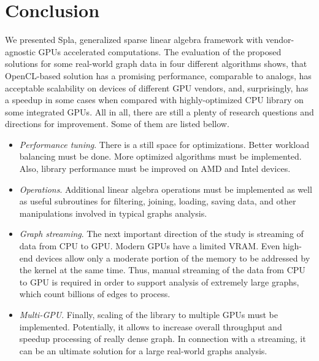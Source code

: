 \section{Conclusion}

We presented Spla, generalized sparse linear algebra framework with vendor-agnostic GPUs accelerated computations. The evaluation of the proposed solutions for some real-world graph data in four different algorithms shows, that OpenCL-based solution has a promising performance, comparable to analogs, has acceptable scalability on devices of different GPU vendors, and, surprisingly, has a speedup in some cases when compared with highly-optimized CPU library on some integrated GPUs. All in all, there are still a plenty of research questions and directions for improvement. Some of them are listed bellow.

\begin{itemize}
    \item \textit{Performance tuning}. There is a still space for optimizations. Better workload balancing must be done. More optimized algorithms must be implemented. Also, library performance must be improved on AMD and Intel devices.
    \item \textit{Operations}. Additional linear algebra operations must be implemented as well as useful subroutines for filtering, joining, loading, saving data, and other manipulations involved in typical graphs analysis.
    \item \textit{Graph streaming}. The next important direction of the study is streaming of data from CPU to GPU. Modern GPUs have a limited VRAM. Even high-end devices allow only a moderate portion of the memory to be addressed by the kernel at the same time. Thus, manual streaming of the data from CPU to GPU is required in order to support analysis of extremely large graphs, which count billions of edges to process.
    \item \textit{Multi-GPU}. Finally, scaling of the library to multiple GPUs must be implemented. Potentially, it allows to increase overall throughput and speedup processing of really dense graph. In connection with a streaming, it can be an ultimate solution for a large real-world graphs analysis.
\end{itemize}